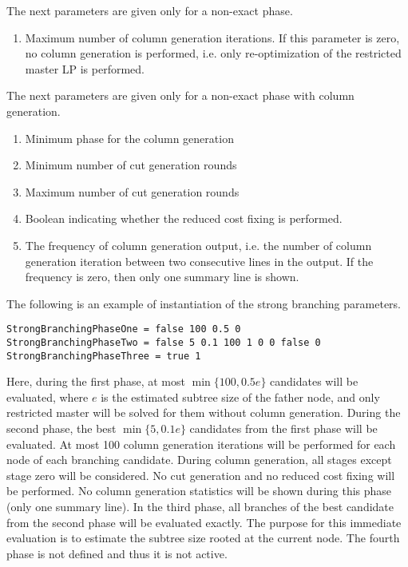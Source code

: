 \documentclass[10pt,a4paper]{article}
\begin{document}
The next parameters are given only for a non-exact phase.
\begin{enumerate}[resume]
\item Maximum number of column generation iterations. If this parameter is zero, no column generation is performed,
  i.e. only re-optimization of the restricted master LP is performed.
\end{enumerate}

The next parameters are given only for a non-exact phase with column generation.
\begin{enumerate}[resume]
\item Minimum phase for the column generation
\item Minimum number of cut generation rounds
\item Maximum number of cut generation rounds
\item Boolean indicating whether the reduced cost fixing is performed.
\item The frequency of column generation output, i.e. the number of column generation iteration between two consecutive
  lines in the output. If the frequency is zero, then only one summary line is shown.
\end{enumerate}

The following is an example of instantiation of the strong branching parameters.
\begin{lstlisting}
StrongBranchingPhaseOne = false 100 0.5 0
StrongBranchingPhaseTwo = false 5 0.1 100 1 0 0 false 0
StrongBranchingPhaseThree = true 1
\end{lstlisting}
Here, during the first phase, at most $\min\{100,0.5e\}$ candidates will be evaluated, where $e$ is the estimated
subtree size of the father node, and only restricted master will be solved for them without column generation. During
the second phase, the best $\min\{5,0.1e\}$ candidates from the first phase will be evaluated. At most 100 column
generation iterations will be performed for each node of each branching candidate. During column generation, all stages
except stage zero will be considered. No cut generation and no reduced cost fixing will be performed. No column
generation statistics will be shown during this phase (only one summary line).  In the third phase, all branches of the
best candidate from the second phase will be evaluated exactly. The purpose for this immediate evaluation is to estimate
the subtree size rooted at the current node. The fourth phase is not defined and thus it is not active.
\end{document}
